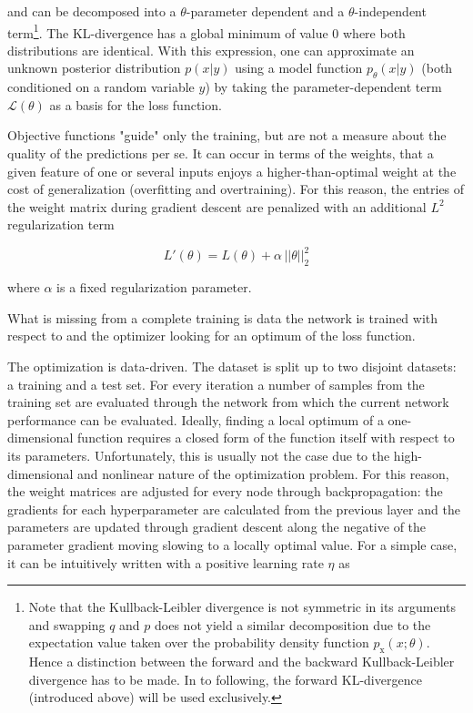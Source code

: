 and can be decomposed into a $\theta$-parameter dependent and a $\theta$-independent term\footnote{Note that the Kullback-Leibler divergence is not symmetric in its arguments and swapping $q$ and $p$ does not yield a similar decomposition due to the expectation value taken over the probability density function $p_\text{x}(x; \theta)$. Hence a distinction between the forward and the backward Kullback-Leibler divergence has to be made. In to following, the forward KL-divergence (introduced above) will be used exclusively.}. The KL-divergence has a global minimum of value 0 where both distributions are identical. With this expression, one can approximate an unknown posterior distribution $p(x | y)$ using a model function $p_\theta(x | y)$ (both conditioned on a random variable $y$) by taking the parameter-dependent term $\mathcal{L}(\theta)$ as a basis for the loss function.

Objective functions "guide" only the training, but are not a measure about the quality of the predictions per se. It can occur in terms of the weights, that a given feature of one or several inputs enjoys a higher-than-optimal weight at the cost of generalization (overfitting and overtraining). For this reason, the entries of the weight matrix during gradient descent are penalized with an additional $L^2$ regularization term

\begin{equation}
	L'(\theta) = L(\theta) + \alpha \, ||\theta|| _2^2
\end{equation}

where $\alpha$ is a fixed regularization parameter.

What is missing from a complete training is data the network is trained with respect to and the optimizer looking for an optimum of the loss function.



The optimization is data-driven. The dataset is split up to two disjoint datasets: a training and a test set. For every iteration a number of samples from the training set are evaluated through the network from which the current network performance can be evaluated. Ideally, finding a local optimum of a one-dimensional function requires a closed form of the function itself with respect to its parameters. Unfortunately, this is usually not the case due to the high-dimensional and nonlinear nature of the optimization problem. For this reason, the weight matrices are adjusted for every node through backpropagation: the gradients for each hyperparameter are calculated from the previous layer and the parameters are updated through gradient descent along the negative of the parameter gradient moving slowing to a locally optimal value. For a simple case, it can be intuitively written with a positive learning rate $\eta$ as

